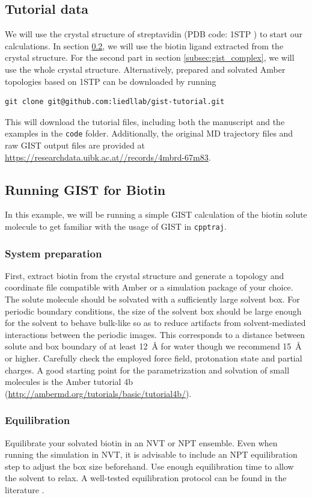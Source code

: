 \documentclass[9pt,tutorial,pubversion]{livecoms}
\newcommand{\software}{\texttt}
\newcommand\inlinecode{\texttt}
\begin{document}
\subsection{Tutorial data}
We will use the crystal structure of streptavidin (PDB code: 1STP \cite{Weber1989-streptavidin-structure}) to start our calculations.
In section \ref{subsec:gist_biotin}, we will use the biotin ligand extracted from the crystal structure.
For the second part in section \ref{subsec:gist_complex}, we will use the whole crystal structure.
Alternatively, prepared and solvated Amber topologies based on 1STP can be downloaded by running
\begin{lstlisting}[style=bash]
git clone git@github.com:liedllab/gist-tutorial.git
\end{lstlisting}
This will download the tutorial files, including both the manuscript and the examples in the \inlinecode{code} folder.
Additionally, the original MD trajectory files and raw GIST output files are provided at \url{https://researchdata.uibk.ac.at//records/4mbrd-67m83}.
\subsection{Running GIST for Biotin}
\label{subsec:gist_biotin}
In this example, we will be running a simple GIST calculation of the biotin solute molecule to get familiar with the usage of GIST in \software{cpptraj}.
\subsubsection{System preparation}
First, extract biotin from the crystal structure and generate a topology and coordinate file compatible with Amber or a simulation package of your choice.
The solute molecule should be solvated with a sufficiently large solvent box. 
For periodic boundary conditions, the size of the solvent box should be large enough for the solvent to behave bulk-like so as to reduce artifacts from solvent-mediated interactions between the periodic images. 
This corresponds to a distance between solute and box boundary of at least \qty{12}{\angstrom} for water \cite{Chen2021,Waibl2022-gist-solvents} though we recommend \qty{15}{\angstrom} or higher.
Carefully check the employed force field, protonation state and partial charges.
A good starting point for the parametrization and solvation of small molecules is the Amber tutorial 4b (\url{http://ambermd.org/tutorials/basic/tutorial4b/}).

\subsubsection{Equilibration}
Equilibrate your solvated biotin in an NVT or NPT ensemble.
Even when running the simulation in NVT, it is advisable to include an NPT equilibration step to adjust the box size beforehand.
Use enough equilibration time to allow the solvent to relax. 
A well-tested equilibration protocol can be found in the literature \cite{Roe2020-equilibration}.
\end{document}
